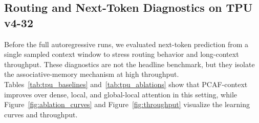 \documentclass{article}
\newcommand{\tableformat}{\footnotesize\setlength{\tabcolsep}{4pt}\renewcommand{\arraystretch}{1.08}}
\begin{document}
\subsection{Routing and Next-Token Diagnostics on TPU v4-32}

Before the full autoregressive runs, we evaluated next-token prediction from a
single sampled context window to stress routing behavior and long-context
throughput. These diagnostics are not the headline benchmark, but they isolate
the associative-memory mechanism at high throughput. Tables~\ref{tab:tpu_baselines}
and~\ref{tab:tpu_ablations} show that PCAF-context improves over dense,
local, and global-local attention in this setting, while
Figure~\ref{fig:ablation_curves} and Figure~\ref{fig:throughput} visualize the
learning curves and throughput.

\begin{table}[!htbp]
  \centering
  \caption{Next-token diagnostic baselines on WikiText-103 using TPU v4-32. Throughput is reported in million tokens per second across the full pod.}
  \label{tab:tpu_baselines}
  \begingroup
  \tableformat
  \endgroup
\end{table}
\end{document}
